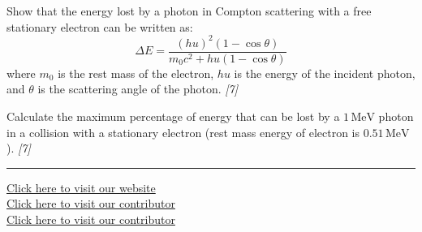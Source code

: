 \documentclass[11pt,a4paper]{article}
\newcommand{\pts}[1]{\hfill   \textit{[#1]}}
\begin{document}
\begin{parts}
  \item Show that the energy lost by a photon in Compton scattering with a free stationary electron can be written as:
  \[
  \Delta E = \frac{(h
u)^2 (1 - \cos \theta)}{m_0 c^2 + h
u(1 - \cos \theta)}
  \]
  where $m_0$ is the rest mass of the electron, $h
u$ is the energy of the incident photon, and $ \theta$ is the scattering angle of the photon. \pts{7}
  \item Calculate the maximum percentage of energy that can be lost by a $1\, \text{MeV}$ photon in a collision with a stationary electron (rest mass energy of electron is $0.51\, \text{MeV}$). \pts{7}
\end{parts}

\vfill
\rule{\linewidth}{0.4pt}

\begin{center}\small
  \href{https://bhu-exam.vercel.app/}{Click here to visit our website}\\[4pt]
  \href{https://me-aryan.vercel.app/}{Click here to visit our contributor}\\[4pt]
  \href{https://quashan-me.vercel.app/}{Click here to visit our contributor}
\end{center}
\end{document}
